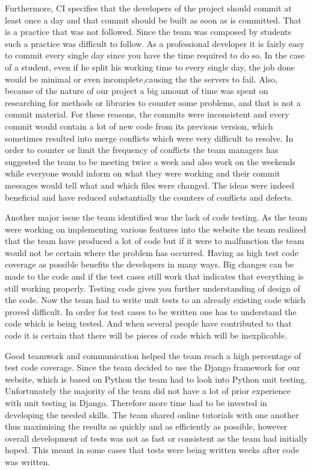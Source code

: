 \documentclass{l3proj}
\begin{document}
Furthermore, CI specifies that the developers of the project should commit at least once a day and that commit should be built as soon as is committed. That is a practice that was not followed. Since the team was composed by students such a practice was difficult to follow. As a professional developer it is fairly easy to commit every single day since you have the time required to do so. In the case of a student, even if he split his working time to every single day, the job done would be minimal or even incomplete,causing the the servers to fail. Also, because of the nature of our project a big amount of time was spent on researching for methods or libraries to counter some problems, and that is not a commit material. For these reasons, the commits were inconsistent and every commit would contain a lot of new code from its previous version, which sometimes resulted into merge conflicts which were very difficult to resolve. In order to counter or limit the frequency of conflicts the team managers has suggested the team to be meeting twice a week and also work on the weekends while everyone would inform on what they were working and their commit messages would tell what and which files were changed. The ideas were indeed beneficial and have reduced substantially the counters of conflicts and defects.

Another major issue the team identified was the lack of code testing. As the team were working on implementing various features into the website the team realized that the team have produced a lot of code but if it were to malfunction the team would not be certain where the problem has occurred. Having as high test code coverage as possible benefits the developers in many ways. Big changes can be made to the code and if the test cases still work that indicates that everything is still working properly. Testing code gives you further understanding of design of the code. Now the team had to write unit tests to an already existing code which proved difficult. In order for test cases to be written one has to understand the code which is being tested. And when several people have contributed to that code it is certain that there will be pieces of code which will be inexplicable.

Good teamwork and communication helped the team reach a high percentage of test code coverage. Since the team decided to use the Django framework for our website, which is based on Python the team had to look into Python unit testing. Unfortunately the majority of the team did not have a lot of prior experience with unit testing in Django. Therefore more time had to be invested in developing the needed skills. The team shared online tutorials with one another thus maximising the results as quickly and as efficiently as possible, however overall development of tests was not as fast or consistent as the team had initially hoped. This meant in some cases that tests were being written weeks after code was written.
\end{document}
